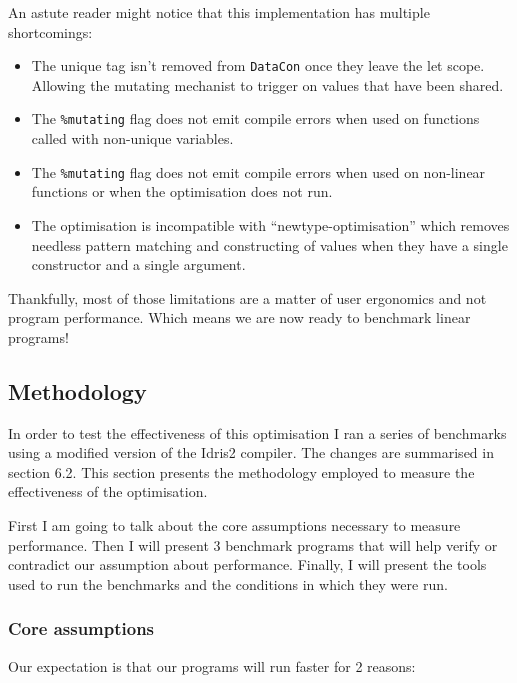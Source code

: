 \documentclass[
]{article}
\providecommand{\tightlist}{%
  \setlength{\itemsep}{0pt}\setlength{\parskip}{0pt}}
\begin{document}
An astute reader might notice that this implementation has multiple
shortcomings:

\begin{itemize}
\tightlist
\item
  The unique tag isn't removed from \texttt{DataCon} once they leave the
  let scope. Allowing the mutating mechanist to trigger on values that
  have been shared.
\item
  The \texttt{\%mutating} flag does not emit compile errors when used on
  functions called with non-unique variables.
\item
  The \texttt{\%mutating} flag does not emit compile errors when used on
  non-linear functions or when the optimisation does not run.
\item
  The optimisation is incompatible with ``newtype-optimisation'' which
  removes needless pattern matching and constructing of values when they
  have a single constructor and a single argument.
\end{itemize}

Thankfully, most of those limitations are a matter of user ergonomics
and not program performance. Which means we are now ready to benchmark
linear programs!

\hypertarget{methodology}{%
\subsection{Methodology}\label{methodology}}

In order to test the effectiveness of this optimisation I ran a series
of benchmarks using a modified version of the Idris2 compiler. The
changes are summarised in section 6.2. This section presents the
methodology employed to measure the effectiveness of the optimisation.

First I am going to talk about the core assumptions necessary to measure
performance. Then I will present 3 benchmark programs that will help
verify or contradict our assumption about performance. Finally, I will
present the tools used to run the benchmarks and the conditions in which
they were run.

\hypertarget{core-assumptions}{%
\subsubsection{Core assumptions}\label{core-assumptions}}

Our expectation is that our programs will run faster for 2 reasons:
\end{document}
